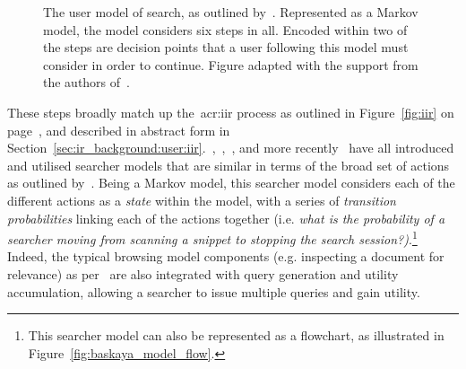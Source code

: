 \begin{figure}[t!]
    \centering
    \caption[Markov model of the search process by~\cite{baskaya2013behavioural_factors}]{The user model of search, as outlined by~\citealt{baskaya2013behavioural_factors}. Represented as a Markov model, the model considers six steps in all. Encoded within two of the steps are decision points that a user following this model must consider in order to continue. Figure adapted with the support from the authors of~\citealt{baskaya2013behavioural_factors}.}
    \label{fig:baskaya_model}
\end{figure}

These steps broadly match up the~\gls{acr:iir} process as outlined in Figure~\ref{fig:iir} on page~\pageref{fig:iir}, and described in abstract form in Section~\ref{sec:ir_background:user:iir}.~\cite{azzopardi2011economics},~\cite{yilmaz2010browsing_utility},~\cite{carterette2011models}, and more recently~\cite{zhang2017simulation_model} have all introduced and utilised searcher models that are similar in terms of the broad set of actions as outlined by~\cite{baskaya2013behavioural_factors}. Being a Markov model, this searcher model considers each of the different actions as a \emph{state} within the model, with a series of \emph{transition probabilities} linking each of the actions together (i.e. \emph{what is the probability of a searcher moving from scanning a snippet to stopping the search session?)}.\footnote{This searcher model can also be represented as a flowchart, as illustrated in Figure~\ref{fig:baskaya_model_flow}.} Indeed, the typical browsing model components (e.g. inspecting a document for relevance) as per~\cite{carterette2011effectiveness_evaluation} are also integrated with query generation and utility accumulation, allowing a searcher to issue multiple queries and gain utility.

